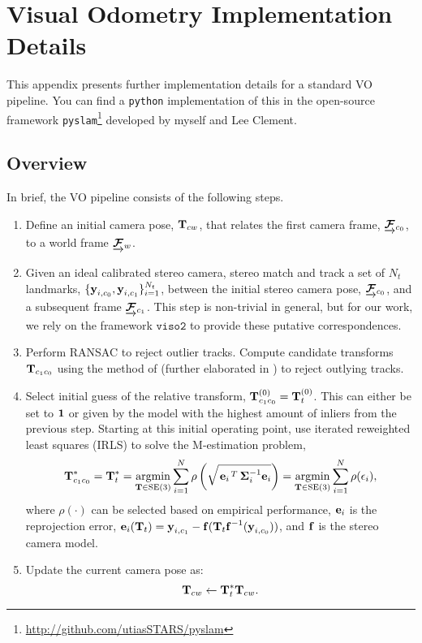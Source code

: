 \chapter{Visual Odometry Implementation Details}
\label{app:appendix_vo}

This appendix presents further implementation details for a standard VO pipeline. You can find a \texttt{python} implementation of this in the open-source framework \texttt{pyslam}\footnote{\url{http://github.com/utiasSTARS/pyslam}} developed by myself and Lee Clement. 

\section{Overview}
In brief, the VO pipeline consists of the following steps.
\begin{enumerate}
\item Define an initial camera pose, $\boldsymbol{\mathbf{T}}_{cw}$, that relates the first camera frame, $\underrightarrow{ \boldsymbol{\mathbf{\mathcal{F}}} }_{c_0}$, to a world frame $\underrightarrow{ \boldsymbol{\mathbf{\mathcal{F}}} }_{w}$.
\item Given an ideal calibrated stereo camera, stereo match and track a set of $N_t$ landmarks, $\{\boldsymbol{\mathbf{y}}_{i, c_0}, \boldsymbol{\mathbf{y}}_{i, c_1}\}_{i=1}^{N_t}$, between the initial stereo camera pose, $\underrightarrow{ \boldsymbol{\mathbf{\mathcal{F}}} }_{c_0}$, and a subsequent frame $\underrightarrow{ \boldsymbol{\mathbf{\mathcal{F}}} }_{c_1}$. This step is non-trivial in general, but for our work, we rely on the framework $\texttt{viso2}$ to provide these putative correspondences.
\item Perform RANSAC to reject outlier tracks. Compute candidate transforms $\boldsymbol{\mathbf{T}}_{c_1c_0}$ using the method of \cite{Umeyama1991-ws} (further elaborated in \cite{Barfoot2017-ri}) to reject outlying tracks.
\item Select initial guess of the relative transform, $\boldsymbol{\mathbf{T}}_{c_1c_0}^{(0)} =  \boldsymbol{\mathbf{T}}_t^{(0)}$. This can either be set to $\boldsymbol{\mathbf{1}}$ or given by the model with the highest amount of inliers from the previous step. Starting at this initial operating point, use iterated reweighted least squares (IRLS) to solve the M-estimation problem,  
\begin{equation}
\label{eq:vo_app_robust_loss}
  \boldsymbol{\mathbf{T}}_{c_1c_0}^* = \boldsymbol{\mathbf{T}}_t^* = \operatorname*{argmin}_{\boldsymbol{\mathbf{T}}\in\text{SE}(3)}\sum_{i=1}^{N} 
  \rho\left(\sqrt{\left.{\boldsymbol{\mathbf{e}}_{i}}\right.^T \boldsymbol{\mathbf{\Sigma}}_{i}^{-1} \boldsymbol{\mathbf{e}}_{i}}\right) = \operatorname*{argmin}_{\boldsymbol{\mathbf{T}}\in\text{SE}(3)}\sum_{i=1}^{N} 
  \rho(\epsilon_i),
\end{equation}
where $\rho(\cdot)$ can be selected based on empirical performance, $\boldsymbol{\mathbf{e}}_i$ is the reprojection error, $\boldsymbol{\mathbf{e}}_{i}(\boldsymbol{\mathbf{T}}_t)  = \boldsymbol{\mathbf{y}}_{i, c_1} - \boldsymbol{\mathbf{f}}( \boldsymbol{\mathbf{T}}_t 
    \boldsymbol{\mathbf{f}}^{-1}( \boldsymbol{\mathbf{y}}_{i, c_0} ) )$, and $\boldsymbol{\mathbf{f}}$ is the stereo camera model.
\item Update the current camera pose as:
\begin{equation}
	\boldsymbol{\mathbf{T}}_{cw} \leftarrow  \boldsymbol{\mathbf{T}}_t^* \boldsymbol{\mathbf{T}}_{cw}.
\end{equation}
\end{enumerate}

